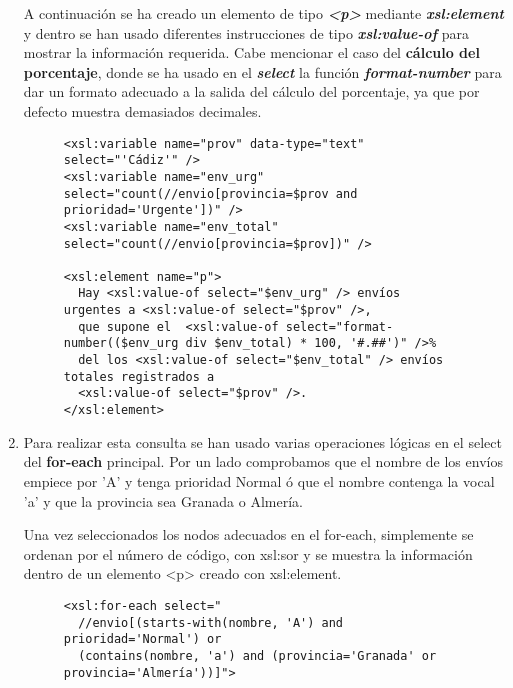 \begin{enumerate}[label=\Alph*.]
    A continuación se ha creado un elemento de tipo \textbf{\textit{<p>}} mediante \textbf{\textit{xsl:element}} y dentro se han usado diferentes instrucciones de tipo \textbf{\textit{xsl:value-of}} para mostrar la información requerida. Cabe mencionar el caso del \textbf{cálculo del porcentaje}, donde se ha usado en el \textbf{\textit{select}} la función \textbf{\textit{format-number}} para dar un formato adecuado a la salida del cálculo del porcentaje, ya que por defecto muestra demasiados decimales.

    \begin{figure}[H]
        \begin{tcolorbox}[sharp corners, colback=yellow!30, colframe=white!20]
            \tiny
\begin{verbatim}
<xsl:variable name="prov" data-type="text" select="'Cádiz'" />
<xsl:variable name="env_urg" select="count(//envio[provincia=$prov and prioridad='Urgente'])" />
<xsl:variable name="env_total" select="count(//envio[provincia=$prov])" />

<xsl:element name="p">
  Hay <xsl:value-of select="$env_urg" /> envíos urgentes a <xsl:value-of select="$prov" />,
  que supone el  <xsl:value-of select="format-number(($env_urg div $env_total) * 100, '#.##')" />%
  del los <xsl:value-of select="$env_total" /> envíos totales registrados a
  <xsl:value-of select="$prov" />.
</xsl:element>
\end{verbatim}
        \end{tcolorbox}
    \end{figure}

    \item Para realizar esta consulta se han usado varias operaciones lógicas en el select del \textbf{for-each} principal. Por un lado comprobamos que el nombre de los envíos empiece por 'A' y tenga prioridad Normal ó que el nombre contenga la vocal 'a' y que la provincia sea Granada o Almería.

    Una vez seleccionados los nodos adecuados en el for-each, simplemente se ordenan por el número de código, con xsl:sor y se muestra la información dentro de un elemento <p> creado con xsl:element.

    \begin{figure}[H]
        \begin{tcolorbox}[sharp corners, colback=yellow!30, colframe=white!20]
            \scriptsize
\begin{verbatim}
<xsl:for-each select="
  //envio[(starts-with(nombre, 'A') and prioridad='Normal') or
  (contains(nombre, 'a') and (provincia='Granada' or provincia='Almería'))]">


\end{verbatim}
\end{tcolorbox}
\end{figure}
\end{enumerate}
